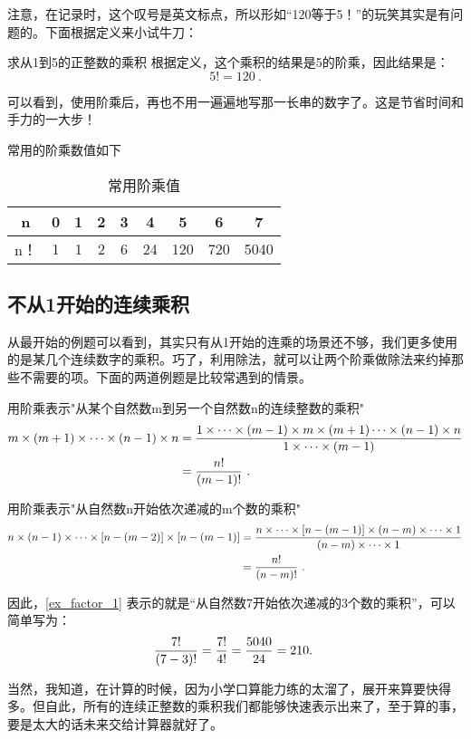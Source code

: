 注意，在记录时，这个叹号是英文标点，所以形如“120等于5！”的玩笑其实是有问题的。下面根据定义来小试牛刀：

\begin{example}{求从1到5的正整数的乘积}
根据定义，这个乘积的结果是5的阶乘，因此结果是：
$$5! = 120~.$$
\end{example}

可以看到，使用阶乘后，再也不用一遍遍地写那一长串的数字了。这是节省时间和手力的一大步！

常用的阶乘数值如下\begin{table}[ht]
\centering
\caption{常用阶乘值}\label{tab_factor1}
\begin{tabular}{|c|c|c|c|c|c|c|c|c|}
\hline
n & 0 & 1 & 2 & 3 & 4 & 5 & 6 & 7\\
\hline
n！ & 1 & 1 & 2 & 6 & 24 & 120 & 720 & 5040\\
\hline
\end{tabular}
\end{table}

\subsection{不从1开始的连续乘积}

从最开始的例题可以看到，其实只有从1开始的连乘的场景还不够，我们更多使用的是某几个连续数字的乘积。巧了，利用除法，就可以让两个阶乘做除法来约掉那些不需要的项。下面的两道例题是比较常遇到的情景。

\begin{example}{用阶乘表示"从某个自然数m到另一个自然数n的连续整数的乘积"}
\begin{align*}
m\times(m+1)\times\cdots \times(n-1)\times n&={1\times\cdots \times(m-1)\times m\times(m+1)\cdots \times(n-1)\times n\over 1\times\cdots \times(m-1)}\\
&={n!\over (m-1)!}~.
\end{align*}
\end{example}

\begin{example}{用阶乘表示"从自然数n开始依次递减的m个数的乘积"}
\begin{align*}
n\times(n-1)\times\cdots \times[n-(m-2)]\times [n-(m-1)]&={n\times\cdots \times [n-(m-1)]\times(n-m)\times\cdots\times1\over (n-m)\times\cdots \times1}\\
&={n!\over (n-m)!}~.
\end{align*}
\end{example}

因此，\autoref{ex_factor_1} 表示的就是“从自然数7开始依次递减的3个数的乘积”，可以简单写为：
$${7!\over (7-3)!}={7!\over 4!}={5040\over 24}=210.~$$

当然，我知道，在计算的时候，因为小学口算能力练的太溜了，展开来算要快得多。但自此，所有的连续正整数的乘积我们都能够快速表示出来了，至于算的事，要是太大的话未来交给计算器就好了。